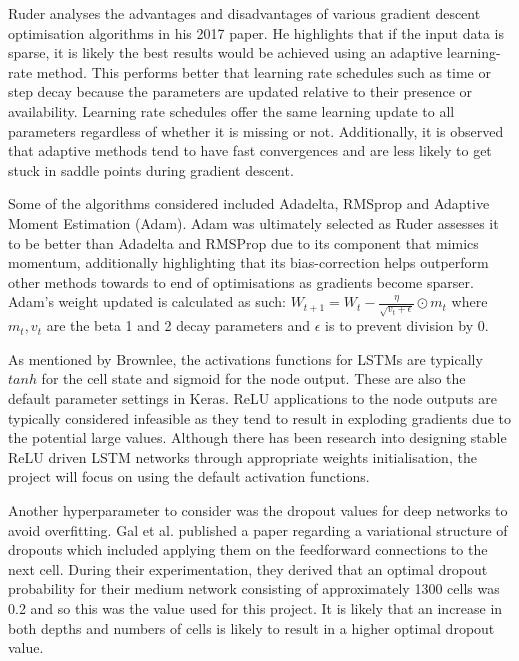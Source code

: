 \documentclass[10pt,onecolumn,letterpaper]{article}
\begin{document}
Ruder analyses the advantages and disadvantages of various gradient descent optimisation algorithms in his 2017 paper\cite{Ruder}. He highlights that if the input data is sparse, it is likely the best results would be achieved using an adaptive learning-rate method. This performs better that learning rate schedules such as time or step decay because the parameters are updated relative to their presence or availability. Learning rate schedules offer the same learning update to all parameters regardless of whether it is missing or not. Additionally, it is observed that adaptive methods tend to have fast convergences and are less likely to get stuck in saddle points during gradient descent. 

Some of the algorithms considered included Adadelta, RMSprop and Adaptive Moment Estimation (Adam). Adam\cite{Adam} was ultimately selected as Ruder assesses it to be better than Adadelta and RMSProp due to its component that mimics momentum, additionally highlighting that its bias-correction helps outperform other methods towards to end of optimisations as gradients become sparser. Adam's weight updated is calculated as such: $W_{t+1}=W_{t}-\frac{\eta}{\sqrt{v_{t}+\epsilon}}\odot m_{t}$ where $m_{t}, v_{t}$ are the beta 1 and 2 decay parameters and $\epsilon$ is to prevent division by 0.

As mentioned by Brownlee\cite{brownlee_activation}, the activations functions for LSTMs are typically $tanh$ for the cell state and sigmoid for the node output. These are also the default parameter settings in Keras. ReLU applications to the node outputs are typically considered infeasible as they tend to result in exploding gradients due to the potential large values. Although there has been research into designing stable ReLU driven LSTM networks through appropriate weights initialisation, the project will focus on using the default activation functions.    

Another hyperparameter to consider was the dropout values for deep networks to avoid overfitting. Gal et al.\cite{Gal} published a paper regarding a variational structure of dropouts which included applying them on the feedforward connections to the next cell. During their experimentation, they derived that an optimal dropout probability for their medium network consisting of approximately 1300 cells was 0.2 and so this was the value used for this project. It is likely that an increase in both depths and numbers of cells is likely to result in a higher optimal dropout value.
\end{document}
